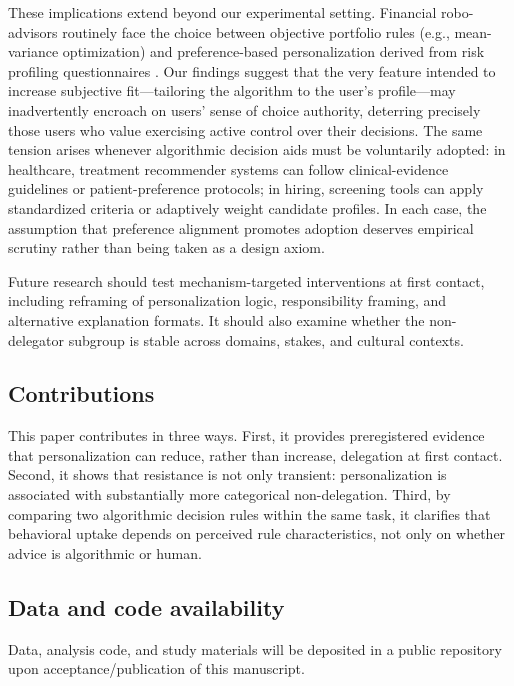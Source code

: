 \documentclass[a4paper, 12pt, fleqn]{article}
\theoremstyle{definition}
\begin{document}
These implications extend beyond our experimental setting. Financial robo-advisors routinely face the choice between objective portfolio rules (e.g., mean-variance optimization) and preference-based personalization derived from risk profiling questionnaires \citep{Capponi2022,Ruehr2020}. Our findings suggest that the very feature intended to increase subjective fit---tailoring the algorithm to the user's profile---may inadvertently encroach on users' sense of choice authority, deterring precisely those users who value exercising active control over their decisions. The same tension arises whenever algorithmic decision aids must be voluntarily adopted: in healthcare, treatment recommender systems can follow clinical-evidence guidelines or patient-preference protocols; in hiring, screening tools can apply standardized criteria or adaptively weight candidate profiles. In each case, the assumption that preference alignment promotes adoption deserves empirical scrutiny rather than being taken as a design axiom.

Future research should test mechanism-targeted interventions at first contact, including reframing of personalization logic, responsibility framing, and alternative explanation formats. It should also examine whether the non-delegator subgroup is stable across domains, stakes, and cultural contexts.

\subsection{Contributions}
This paper contributes in three ways. First, it provides preregistered evidence that personalization can reduce, rather than increase, delegation at first contact. Second, it shows that resistance is not only transient: personalization is associated with substantially more categorical non-delegation. Third, by comparing two algorithmic decision rules within the same task, it clarifies that behavioral uptake depends on perceived rule characteristics, not only on whether advice is algorithmic or human.

\subsection{Data and code availability}
Data, analysis code, and study materials will be deposited in a public repository upon acceptance/publication of this manuscript. %
\end{document}
